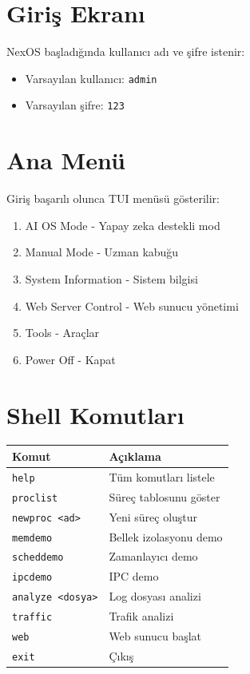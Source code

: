 \documentclass[12pt,a4paper]{report}
\begin{document}
\section{Giriş Ekranı}

NexOS başladığında kullanıcı adı ve şifre istenir:

\begin{itemize}
    \item Varsayılan kullanıcı: \texttt{admin}
    \item Varsayılan şifre: \texttt{123}
\end{itemize}

\section{Ana Menü}

Giriş başarılı olunca TUI menüsü gösterilir:

\begin{enumerate}
    \item AI OS Mode - Yapay zeka destekli mod
    \item Manual Mode - Uzman kabuğu
    \item System Information - Sistem bilgisi
    \item Web Server Control - Web sunucu yönetimi
    \item Tools - Araçlar
    \item Power Off - Kapat
\end{enumerate}

\section{Shell Komutları}

\begin{tabular}{|l|l|}
\hline
\textbf{Komut} & \textbf{Açıklama} \\
\hline
\texttt{help} & Tüm komutları listele \\
\texttt{proclist} & Süreç tablosunu göster \\
\texttt{newproc <ad>} & Yeni süreç oluştur \\
\texttt{memdemo} & Bellek izolasyonu demo \\
\texttt{scheddemo} & Zamanlayıcı demo \\
\texttt{ipcdemo} & IPC demo \\
\texttt{analyze <dosya>} & Log dosyası analizi \\
\texttt{traffic} & Trafik analizi \\
\texttt{web} & Web sunucu başlat \\
\texttt{exit} & Çıkış \\
\hline
\end{tabular}
\end{document}
